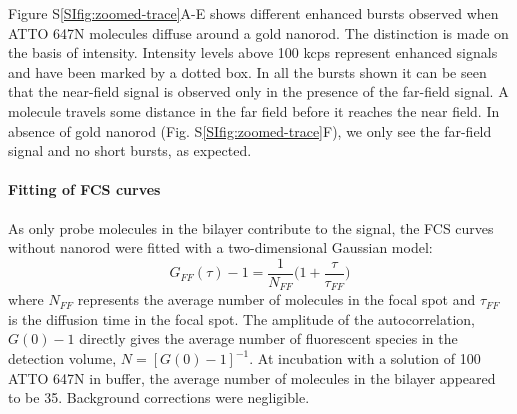 Figure S\ref{SIfig:zoomed-trace}A-E shows different enhanced bursts observed when ATTO 647N molecules diffuse around a gold nanorod.
The distinction is made on the basis of intensity.
Intensity levels above 100 kcps represent enhanced signals and have been marked by a dotted box.
In all the bursts shown it can be seen that the near-field signal is observed only in the presence of the far-field signal.
A molecule travels some distance in the far field before it reaches the near field.
In absence of gold nanorod (Fig. S\ref{SIfig:zoomed-trace}F), we only see the far-field signal and no short bursts, as expected.


\paragraph*{Fitting of FCS curves}
As only probe molecules in the bilayer contribute to the signal, the FCS curves without nanorod were fitted with a two-dimensional Gaussian model:
\begin{equation}
  G_{FF}(\tau)-1 = \frac{1}{N_{FF}}\Bigg(1+\frac{\tau}{\tau_{FF}}\Bigg)
  \label{eq:2Dgauss}
\end{equation}
where $N_{FF}$ represents the average number of molecules in the focal spot and $\tau_{FF}$ is the diffusion time in the focal spot.
The amplitude of the autocorrelation, $G(0)-1$ directly gives the average number of fluorescent species in the detection volume, $N=[G(0)-1]^{-1}$.
At incubation with a solution of \SI{100}{\nM} ATTO 647N in buffer, the average number of molecules in the bilayer appeared to be 35.
Background corrections were negligible.


